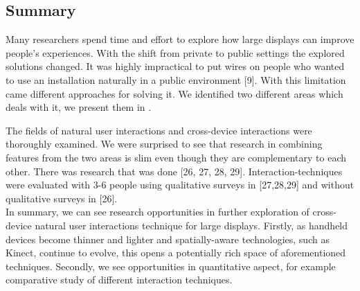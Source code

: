\subsection{Summary}
Many researchers spend time and effort to explore how large displays can improve people's experiences. 
With the shift from private to public settings the explored solutions changed. 
It was highly impractical to put wires on people who wanted to use an installation naturally in a public environment [9].
With this limitation came different approaches for solving it. 
We identified two different areas which deals with it, we present them in .

\begin{figure*}
\centering
{}
\caption{}
\label{fig:litreview}
\end{figure*}

 
The fields of natural user interactions and cross-device interactions were thoroughly examined. 
We were surprised to see that research in combining features from the two areas is slim even though they are complementary to each other. 
There was research that was done [26, 27, 28, 29]. 
Interaction-techniques were evaluated with 3-6 people using qualitative surveys in [27,28,29] and without qualitative surveys in [26].\\

In summary, we can see research opportunities in further exploration of cross-device natural user interactions technique for large displays. 
Firstly, as handheld devices become thinner and lighter and spatially-aware technologies, such as Kinect, continue to evolve, this opens a potentially rich space of aforementioned techniques. 
Secondly, we see opportunities in quantitative aspect, for example comparative study of different interaction techniques. 
